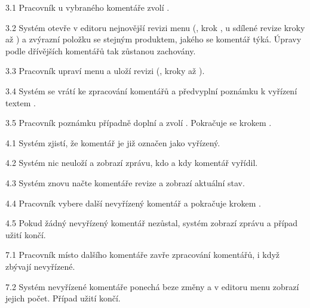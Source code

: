 \begin{ucalt}
  \item[3.1]\label{uc:13:3.1} Pracovník u vybraného komentáře zvolí .
  \item[3.2]\label{uc:13:3.2} Systém otevře v editoru nejnovější revizi menu (, krok , u sdílené revize kroky  až ) a zvýrazní položku se stejným produktem, jakého se komentář týká. Úpravy podle dřívějších komentářů tak zůstanou zachovány.
  \item[3.3]\label{uc:13:3.3} Pracovník upraví menu a uloží revizi (, kroky  až ).
  \item[3.4]\label{uc:13:3.4} Systém se vrátí ke zpracování komentářů a předvyplní poznámku k vyřízení textem .
  \item[3.5]\label{uc:13:3.5} Pracovník poznámku případně doplní a zvolí . Pokračuje se krokem .
\end{ucalt}

\begin{ucalt}
  \item[4.1]\label{uc:13:4.1} Systém zjistí, že komentář je již označen jako vyřízený.
  \item[4.2]\label{uc:13:4.2} Systém nic neuloží a zobrazí zprávu, kdo a kdy komentář vyřídil.
  \item[4.3]\label{uc:13:4.3} Systém znovu načte komentáře revize a zobrazí aktuální stav.
  \item[4.4]\label{uc:13:4.4} Pracovník vybere další nevyřízený komentář a pokračuje krokem .
  \item[4.5]\label{uc:13:4.5} Pokud žádný nevyřízený komentář nezůstal, systém zobrazí zprávu  a případ užití končí.
\end{ucalt}

\begin{ucalt}
  \item[7.1]\label{uc:13:7.1} Pracovník místo dalšího komentáře zavře zpracování komentářů, i když zbývají nevyřízené.
  \item[7.2]\label{uc:13:7.2} Systém nevyřízené komentáře ponechá beze změny a v editoru menu zobrazí jejich počet. Případ užití končí.
\end{ucalt}

